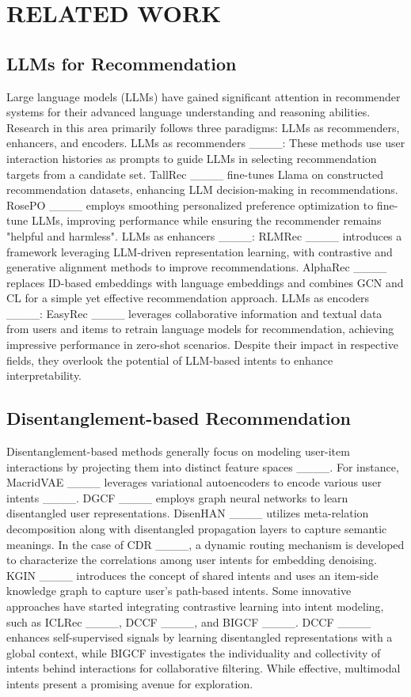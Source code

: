 \section{RELATED WORK}
\subsection{LLMs for Recommendation}
Large language models (LLMs) have gained significant attention in recommender systems for their advanced language understanding and reasoning abilities. Research in this area primarily follows three paradigms: LLMs as recommenders, enhancers, and encoders. LLMs as recommenders ____: These methods use user interaction histories as prompts to guide LLMs in selecting recommendation targets from a candidate set. TallRec ____ fine-tunes Llama on constructed recommendation datasets, enhancing LLM decision-making in recommendations. RosePO ____ employs smoothing personalized preference optimization to fine-tune LLMs, improving performance while ensuring the recommender remains "helpful and harmless". LLMs as enhancers ____: RLMRec ____ introduces a framework leveraging LLM-driven representation learning, with contrastive and generative alignment methods to improve recommendations. AlphaRec ____ replaces ID-based embeddings with language embeddings and combines GCN and CL for a simple yet effective recommendation approach. LLMs as encoders ____: EasyRec ____ leverages collaborative information and textual data from users and items to retrain language models for recommendation, achieving impressive performance in zero-shot scenarios. Despite their impact in respective fields, they overlook the potential of LLM-based intents to enhance interpretability.

\subsection{Disentanglement-based Recommendation}
Disentanglement-based methods generally focus on modeling user-item interactions by projecting them into distinct feature spaces ____. For instance, MacridVAE ____ leverages variational autoencoders to encode various user intents ____. DGCF ____ employs graph neural networks to learn disentangled user representations. DisenHAN ____ utilizes meta-relation decomposition along with disentangled propagation layers to capture semantic meanings. In the case of CDR ____, a dynamic routing mechanism is developed to characterize the correlations among user intents for embedding denoising. KGIN ____ introduces the concept of shared intents and uses an item-side knowledge graph to capture user’s path-based intents. Some innovative approaches have started integrating contrastive learning into intent modeling, such as ICLRec ____, DCCF ____, and BIGCF ____. DCCF ____ enhances self-supervised signals by learning disentangled representations with a global context, while BIGCF investigates the individuality and collectivity of intents behind interactions for collaborative filtering. While effective, multimodal intents present a promising avenue for exploration.

